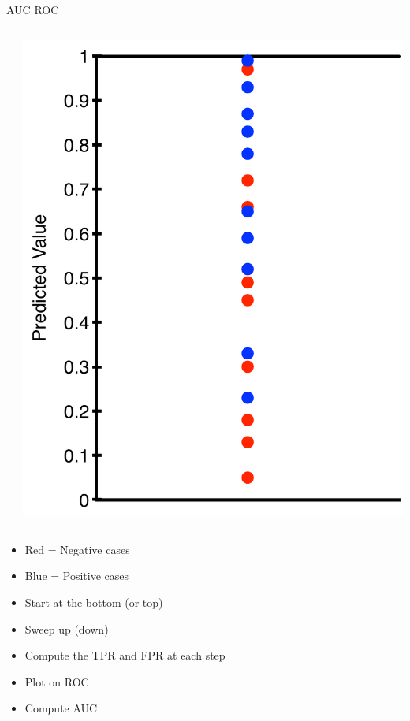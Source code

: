 \documentclass[aspectratio=169]{beamer}
\begin{document}
\begin{frame}{AUC ROC}
\begin{columns}
\begin{column}{0.2\textwidth}
\end{column}
\begin{column}{0.2\textwidth}
    \includegraphics[width=1\textwidth]{lectSup/AUCEx6.pdf} 
\end{column}
\end{columns}
\begin{itemize}
\item Red = Negative cases
\item Blue = Positive cases
\item Start at the bottom (or top)
\item Sweep up (down)
\item Compute the TPR and FPR at each step
\item Plot on ROC
\item Compute AUC
\end{itemize}
\end{frame}
%
\end{document}
